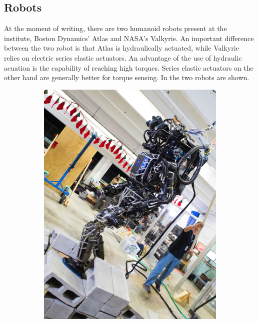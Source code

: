 \subsection{Robots}
At the moment of writing, there are two humanoid robots present at the institute, Boston Dynamics' Atlas and NASA's Valkyrie. An important difference between the two robot is that Atlas is hydraulically actuated, while Valkyrie relies on electric series elastic actuators. An advantage of the use of hydraulic acuation is the capability of reaching high torques. Series elastic actuators on the other hand are generally better for torque sensing. In  the two robots are shown.
\begin{figure}[h]
\centering
  \begin{subfigure}{0.45\textwidth}
  \centering
  \includegraphics[width=.8\linewidth]{STYLESTUFF/AtlasOld.png}
   \caption{}
    \label{fig:atlas}
  \end{subfigure}
  \begin{subfigure}{0.45\textwidth}
    \centering

\end{subfigure}
\end{figure}
